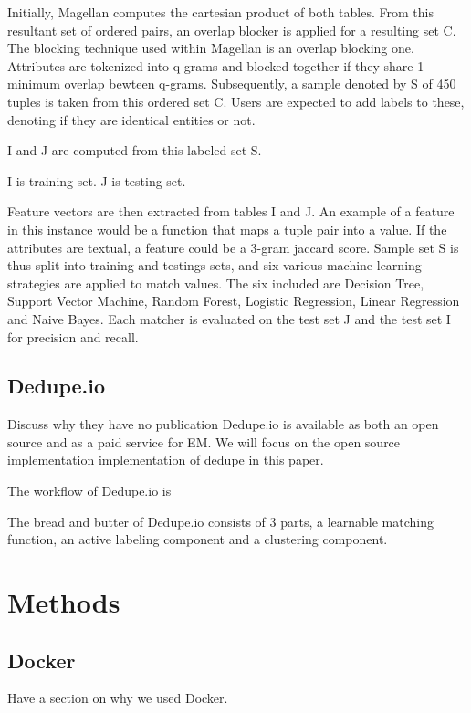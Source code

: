 \documentclass[letterpaper,twocolumn,10pt]{article}
\begin{document}
Initially, Magellan computes the cartesian product of both tables. From this resultant set of ordered pairs, an overlap blocker is applied for a resulting set C. The blocking technique used within Magellan is an overlap blocking one. Attributes are tokenized into q-grams and blocked together if they share 1 minimum overlap bewteen q-grams. Subsequently, a sample denoted by S of 450 tuples is taken from this ordered set C. Users are expected to add labels to these, denoting if they are identical entities or not. 

I and J are computed from this labeled set S.

I is training set. J is testing set.

Feature vectors are then extracted from tables I and J. An example of a feature in this instance would be a function that maps a tuple pair into a value. If the attributes are textual, a feature could be a 3-gram jaccard score. Sample set S is thus split into training and testings sets, and six various machine learning strategies are applied to match values. The six included are Decision Tree, Support Vector Machine, Random Forest, Logistic Regression, Linear Regression and Naive Bayes. Each matcher is evaluated on the test set J and the test set I for precision and recall. 






\subsection{Dedupe.io}
Discuss why they have no publication
Dedupe.io is available as both an open source and as a paid service for EM. We will focus on the open source implementation implementation of dedupe in this paper. 

The workflow of Dedupe.io is 

The bread and butter of Dedupe.io consists of 3 parts, a learnable matching function, an active labeling component and a clustering component. 




\section{Methods}

\subsection{Docker}
Have a section on why we used Docker.
\end{document}
